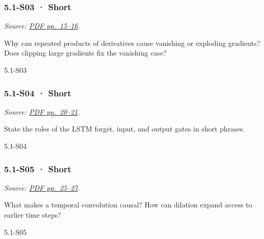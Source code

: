 \noindent\begin{minipage}{\linewidth}

\subsubsection{5.1-S03 · Short}\label{s03-short-12}

\emph{Source:
\href{../Lecture\%20Slides/5.1.\%20Sequence\%20Models.pdf\#page=15}{PDF
pp.~15--16}.}

Why can repeated products of derivatives cause vanishing or exploding
gradients? Does clipping large gradients fix the vanishing case?

\begin{solution}[20mm]{5.1-S03}

\end{solution}
\end{minipage}\par\medskip

\noindent\begin{minipage}{\linewidth}

\subsubsection{5.1-S04 · Short}\label{s04-short-12}

\emph{Source:
\href{../Lecture\%20Slides/5.1.\%20Sequence\%20Models.pdf\#page=20}{PDF
pp.~20--21}.}

State the roles of the LSTM forget, input, and output gates in short
phrases.

\begin{solution}[20mm]{5.1-S04}

\end{solution}
\end{minipage}\par\medskip

\noindent\begin{minipage}{\linewidth}

\subsubsection{5.1-S05 · Short}\label{s05-short-12}

\emph{Source:
\href{../Lecture\%20Slides/5.1.\%20Sequence\%20Models.pdf\#page=25}{PDF
pp.~25--27}.}

What makes a temporal convolution causal? How can dilation expand access
to earlier time steps?

\begin{solution}[20mm]{5.1-S05}

\end{solution}
\end{minipage}\par\medskip

